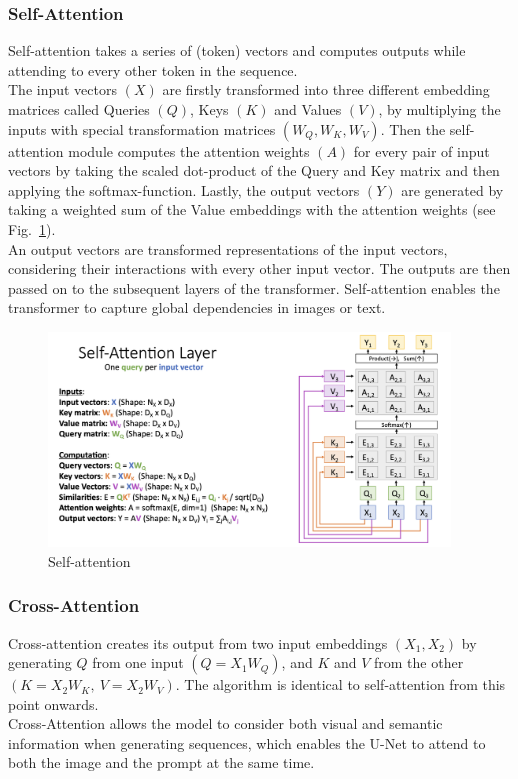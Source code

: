 \subsubsection*{Self-Attention}
Self-attention \cite{vaswani2017attention} takes a series of (token) vectors and computes outputs while attending to every other token in the sequence.\\
The input vectors \((X)\) are firstly transformed into three different embedding matrices called Queries \((Q)\), Keys \((K)\) and Values \((V)\),  by multiplying the inputs with special transformation matrices \((W_Q, W_K, W_V)\). Then the self-attention module computes the attention weights \((A)\) for every pair of input vectors by taking the scaled dot-product of the Query and Key matrix and then applying the softmax-function. Lastly, the output vectors \((Y)\) are generated by taking a weighted sum of the Value embeddings with the attention weights (see Fig.~\ref{fig:self-attn}).\\
An output vectors are transformed representations of the input vectors, considering their interactions with every other input vector. The outputs are then passed on to the subsequent layers of the transformer. Self-attention enables the transformer to capture global dependencies in images or text.
\begin{figure}[!htb]
\centering
\includegraphics[width=0.95\textwidth]
{static/self_attn.png}
\caption{Self-attention \cite{johnson2019attn}}
\label{fig:self-attn}
\end{figure}



\subsubsection*{Cross-Attention}
Cross-attention creates its output from two input embeddings \((X_1, X_2)\) by generating \(Q\) from one input \((Q=X_1W_Q)\), and 
\(K\) and \(V\) from the other \((K=X_2W_K,\ V=X_2W_V)\). The algorithm is identical to self-attention from this point onwards.\\ Cross-Attention allows the model to consider both visual and semantic information when generating sequences, which enables the U-Net to attend to both the image and the prompt at the same time.



